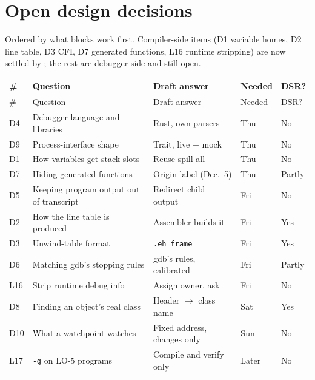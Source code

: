 \documentclass[10pt]{article}
\newcommand{\code}[1]{\texttt{\small #1}}
\begin{document}
\clearpage
\section{Open design decisions}\label{sec:decisions}

Ordered by what blocks work first. Compiler-side items (D1 variable homes, D2 line table, D3 CFI, D7 generated functions, L16 runtime stripping) are now settled by ; the rest are debugger-side and still open.

\begin{xltabular}{\linewidth}{@{}L{0.7cm}Y L{5.0cm} L{1.3cm} L{1.1cm}@{}}
\toprule
\# & Question & Draft answer & Needed & DSR? \\
\midrule
\endfirsthead
\toprule \# & Question & Draft answer & Needed & DSR? \\ \midrule
\endhead
D4 & Debugger language and libraries & Rust, own parsers & Thu & No \\
D9 & Process-interface shape & Trait, live + mock & Thu & No \\
D1 & How variables get stack slots & Reuse spill-all & Thu & No \\
D7 & Hiding generated functions & Origin label (Dec.~5) & Thu & Partly \\
D5 & Keeping program output out of transcript & Redirect child output & Fri & No \\
D2 & How the line table is produced & Assembler builds it & Fri & Yes \\
D3 & Unwind-table format & \code{.eh\_frame} & Fri & Yes \\
D6 & Matching gdb's stopping rules & gdb's rules, calibrated & Fri & Partly \\
L16 & Strip runtime debug info & Assign owner, ask & Fri & No \\
D8 & Finding an object's real class & Header $\to$ class name & Sat & Yes \\
D10 & What a watchpoint watches & Fixed address, changes only & Sun & No \\
L17 & \code{-g} on LO-5 programs & Compile and verify only & Later & No \\
\bottomrule
\end{xltabular}
\end{document}
